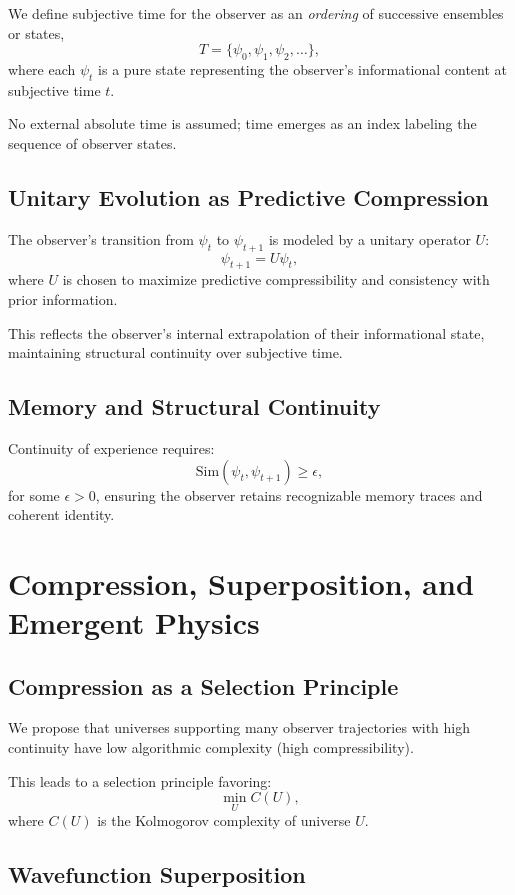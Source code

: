 \documentclass[12pt]{article}
\begin{document}
We define subjective time for the observer as an \emph{ordering} of successive ensembles or states,
\[
      T = \{ \psi_0, \psi_1, \psi_2, \ldots \},
\]
where each \(\psi_t\) is a pure state representing the observer’s informational content at subjective time \(t\).

No external absolute time is assumed; time emerges as an index labeling the sequence of observer states.

\subsection{Unitary Evolution as Predictive Compression}

The observer's transition from \(\psi_t\) to \(\psi_{t+1}\) is modeled by a unitary operator \(U\):
\[
      \psi_{t+1} = U \psi_t,
\]
where \(U\) is chosen to maximize predictive compressibility and consistency with prior information.

This reflects the observer’s internal extrapolation of their informational state, maintaining structural continuity over subjective time.

\subsection{Memory and Structural Continuity}

Continuity of experience requires:
\[
      \mathrm{Sim}(\psi_t, \psi_{t+1}) \geq \epsilon,
\]
for some \(\epsilon > 0\), ensuring the observer retains recognizable memory traces and coherent identity.

\section{Compression, Superposition, and Emergent Physics}

\subsection{Compression as a Selection Principle}

We propose that universes supporting many observer trajectories with high continuity have low algorithmic complexity (high compressibility).

This leads to a selection principle favoring:
\[
      \min_{U} C(U),
\]
where \(C(U)\) is the Kolmogorov complexity of universe \(U\).

\subsection{Wavefunction Superposition}
\end{document}
